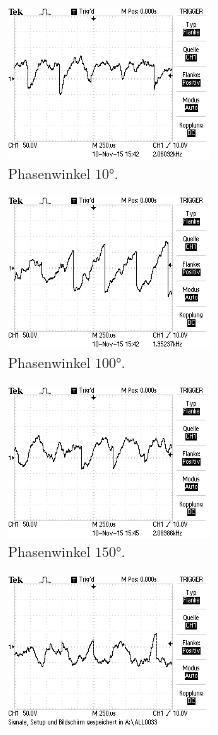 \begin{figure}
  \centering
  \begin{subfigure}{0.48\textwidth}
    \centering
    \includegraphics[height=4cm]{Bilder/r/r10.JPG}
    \caption{Phasenwinkel $10°$.}
    \label{fig:rp10}
  \end{subfigure}
  \begin{subfigure}{0.48\textwidth}
    \centering
    \includegraphics[height=4cm]{Bilder/r/r100.JPG}
    \caption{Phasenwinkel $100°$.}
    \label{fig:rp100}
  \end{subfigure}
  \begin{subfigure}{0.48\textwidth}
    \centering
    \includegraphics[height=4cm]{Bilder/r/r150.JPG}
    \caption{Phasenwinkel $150°$.}
    \label{fig:rp150}
  \end{subfigure}
  \begin{subfigure}{0.48\textwidth}
    \centering
    \includegraphics[height=4cm]{Bilder/r/r190.JPG}

\end{subfigure}
\end{figure}
